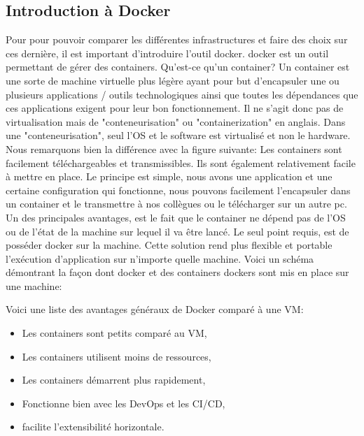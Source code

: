 \documentclass[
    iai, %
    il, %
]{heig-tb}
\begin{document}
\subsection{Introduction à Docker}
Pour pour pouvoir comparer les différentes infrastructures et faire des choix sur ces dernière, il est important d'introduire l'outil \Gls{docker}.
\Gls{docker} est un outil permettant de gérer des containers.
Qu'est-ce qu'un container? Un container est une sorte de machine virtuelle plus légère ayant pour but d'encapsuler une ou plusieurs applications / outils technologiques ainsi que toutes les dépendances que ces applications exigent pour leur bon fonctionnement.
Il ne s'agit donc pas de virtualisation mais de "conteneurisation" ou "containerization" en anglais.
Dans une "conteneurisation", seul l'OS et le software est virtualisé et non le hardware.
Nous remarquons bien la différence avec la figure suivante:
Les containers sont facilement téléchargeables et transmissibles. Ils sont également relativement facile à mettre en place.
Le principe est simple, nous avons une application et une certaine configuration qui fonctionne, nous pouvons facilement l'encapsuler dans un container et le transmettre à nos collègues ou le télécharger sur un autre pc.
Un des principales avantages, est le fait que le container ne dépend pas de l'OS ou de l'état de la machine sur lequel il va être lancé.
Le seul point requis, est de posséder docker sur la machine.
Cette solution rend plus flexible et portable l'exécution d'application sur n'importe quelle machine.
Voici un schéma démontrant la façon dont docker et des containers dockers sont mis en place sur une machine:

Voici une liste des avantages généraux de Docker comparé à une VM:
\begin{itemize}
    \item Les containers sont petits comparé au VM, \cite{koukia}
    \item Les containers utilisent moins de ressources, \cite{koukia}
    \item Les containers démarrent plus rapidement, \cite{koukia}
    \item Fonctionne bien avec les DevOps et les CI/CD, \cite{koukia,data-flair-pros-cons,data-flair-use-cases}
    \item facilite l'extensibilité horizontale. \cite{data-flair-use-cases}
\end{itemize}
\end{document}
